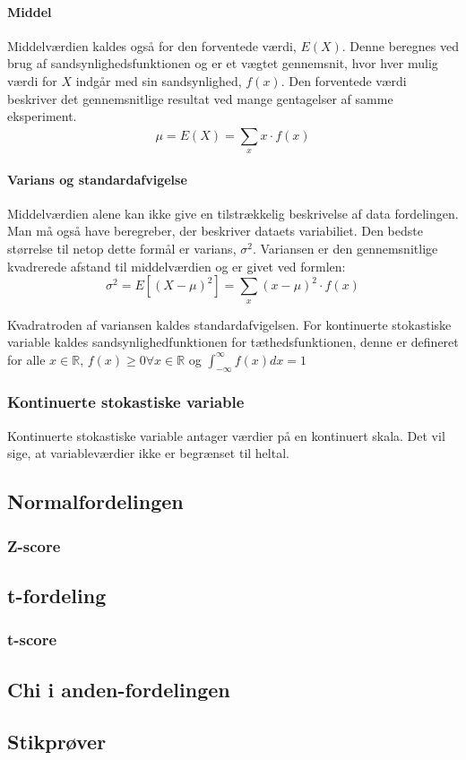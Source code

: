 \paragraph{Middel} Middelværdien kaldes også for den forventede værdi, $E(X)$. Denne beregnes ved brug af sandsynlighedsfunktionen og er et vægtet gennemsnit, hvor hver mulig værdi for $X$ indgår med sin sandsynlighed, $f(x)$. Den forventede værdi beskriver det gennemsnitlige resultat ved mange gentagelser af samme eksperiment.
$$\mu=E(X)=\sum_{x}^{}x \cdot f(x)$$

\paragraph{Varians og standardafvigelse} Middelværdien alene kan ikke give en tilstrækkelig beskrivelse af data fordelingen. Man må også have beregreber, der beskriver dataets variabiliet. Den bedste størrelse til netop dette formål er varians, $\sigma ^2$. Variansen er den gennemsnitlige kvadrerede afstand til middelværdien og er givet ved formlen:
$$\sigma ^2=E[(X-\mu)^2]=\sum_{x}^{}(x-\mu)^2 \cdot f(x)$$

Kvadratroden af variansen kaldes standardafvigelsen. For kontinuerte stokastiske variable kaldes sandsynlighedfunktionen for tæthedsfunktionen, denne er defineret for alle $x \in \mathbb{R}$, $f(x) \ge 0 \forall x \in \mathbb{R}$ og $\int_{-\infty}^{\infty} f(x) dx = 1$ 

\subsubsection{Kontinuerte stokastiske variable}
Kontinuerte stokastiske variable antager værdier på en kontinuert skala. Det vil sige, at variableværdier ikke er begrænset til heltal. 




\subsection{Normalfordelingen}

\subsubsection{Z-score}

\subsection{t-fordeling}

\subsubsection{t-score}

\subsection{Chi i anden-fordelingen}

\subsection{Stikprøver}
